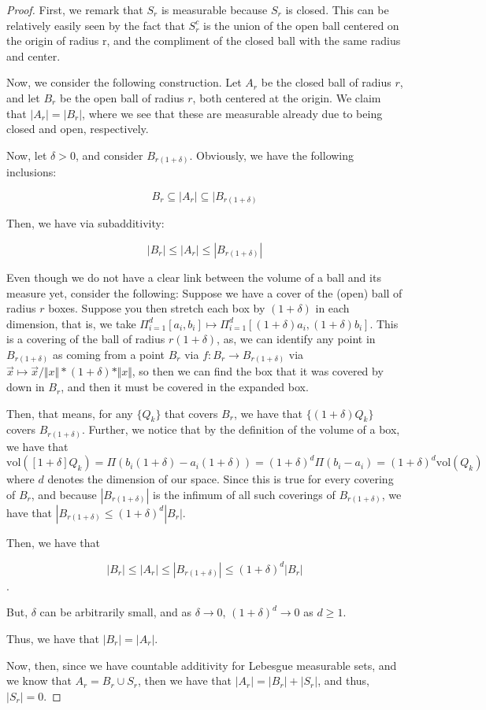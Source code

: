 \documentclass[10pt]{article}
\begin{document}
\begin{proof}[Proof]
First, we remark that $S_r$ is measurable because $S_r$ is closed. This can be relatively easily seen by the fact that $S_r^c$ is the union of the open ball centered on the origin of radius r, and the compliment of the closed ball with the same radius and center.

Now, we consider the following construction. Let $A_r$ be the closed ball of radius $r$, and let $B_r$ be the open ball of radius $r$, both centered at the origin. We claim that $|A_r| = |B_r|$, where we see that these are measurable already due to being closed and open, respectively.

Now, let $\delta >0$, and consider $B_{r(1+\delta)}$. Obviously, we have the following inclusions:

$$ B_r \subseteq |A_r| \subseteq |B_{r(1+\delta)}$$

Then, we have via subadditivity:

$$|B_r| \leq |A_r| \leq |B_{r(1+\delta)}|$$

Even though we do not have a clear link between the volume of a ball and its measure yet, consider the following: Suppose we have a cover of the (open) ball of radius $r$ boxes. Suppose you then stretch each box by $(1 + \delta)$ in each dimension, that is, we take $\Pi_{i=1}^d [a_i,b_i] \mapsto \Pi_{i=1}^d [(1+\delta)a_i,(1+\delta)b_i]$. This is a covering of the ball of radius $r(1 + \delta)$, as, we can identify any point in $B_{r(1+\delta)}$ as coming from a point $B_{r}$ via $f: B_{r} \rightarrow B_{r(1+\delta)}$ via $\vec{x} \mapsto \vec{x}/\Vert x \Vert * (1+ \delta) * \Vert x \Vert$, so then we can find the box that it was covered by down in $B_{r}$, and then it must be covered in the expanded box.

Then, that means, for any $\{ Q_k \}$ that covers $B_r$, we have that $\{ (1+ \delta)Q_k \}$ covers $B_{r(1+\delta)}$. Further, we notice that by the definition of the volume of a box, we have that $\text{vol}([1+\delta]Q_k) = \Pi(b_i(1+\delta) - a_i(1+\delta)) = (1+ \delta)^d \Pi(b_i -a_i) = (1+\delta)^d \text{vol}(Q_k)$ where $d$ denotes the dimension of our space. Since this is true for every covering of $B_r$, and because $|B_{r(1+\delta)}|$ is the infimum of all such coverings of $B_{r(1+\delta)}$, we have that $|B_{r(1+\delta)} \leq (1+ \delta)^d |B_r|$.

Then, we have that

$$|B_r| \leq |A_r| \leq  |B_{r(1+\delta)}| \leq (1+\delta)^d |B_r|$$.

But, $\delta$ can be arbitrarily small, and as $\delta \to 0$, $(1+ \delta)^d \to 0$ as $d \geq 1$.

Thus, we have that $|B_r| = |A_r|$.

Now, then, since we have countable additivity for Lebesgue measurable sets, and we know that $A_r = B_r \cup S_r$, then we have that $|A_r| = |B_r| + |S_r|$, and thus, $|S_r| = 0$.

\end{proof}
\end{document}
